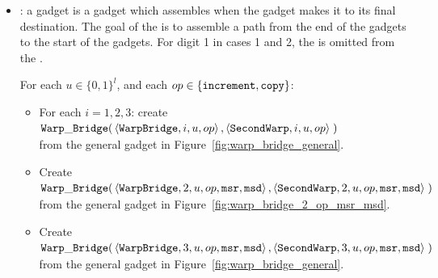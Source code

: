 \begin{itemize}
        \item {\warpbridge}: a {\warpbridge} gadget is a gadget which assembles when the {\firstwarp} gadget makes it
             to its final destination. The goal of the {\warpbridge} is to assemble a path from the end of the {\firstwarp}
             gadgets to the start of the {\secondwarp} gadgets. For digit 1 in cases 1 and 2, the {\warpbridge} is omitted
             from the {\warpunit}.

        For each $u \in \{0, 1\}^l$, and each $op \in \{ {\tt increment, copy } \}$:
        \begin{itemize}

            \item For each $i = 1,2,3$: create
            $\begin{aligned}[t]
                {\tt Warp\_Bridge}(& \left\langle {\tt WarpBridge}, i, u, op \right\rangle,
                              \left\langle {\tt SecondWarp}, i, u, op \right\rangle \;)
            \end{aligned}$ \\ from the general gadget in Figure~\ref{fig:warp_bridge_general}.
            \vspace{.5cm}

            \item Create
            $\begin{aligned}[t]
                {\tt Warp\_Bridge}(& \left\langle {\tt WarpBridge}, 2, u, op, {\tt msr}, {\tt msd} \right\rangle,
                              \left\langle {\tt SecondWarp}, 2, u, op, {\tt msr}, {\tt msd} \right\rangle \;)
            \end{aligned}$ \\ from the general gadget in Figure~\ref{fig:warp_bridge_2_op_msr_msd}.
            \vspace{.5cm}

            \item Create
            $\begin{aligned}[t]
                {\tt Warp\_Bridge}(& \left\langle {\tt WarpBridge}, 3, u, op, {\tt msr}, {\tt msd} \right\rangle,
                              \left\langle {\tt SecondWarp}, 3, u, op, {\tt msr}, {\tt msd} \right\rangle \;)
            \end{aligned}$ \\ from the general gadget in Figure~\ref{fig:warp_bridge_general}.
            \vspace{.5cm}
        \end{itemize}



\end{itemize}

